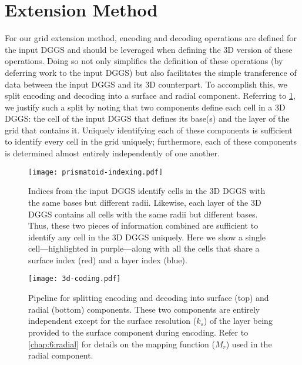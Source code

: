 \section{Extension Method} \label{chap:7:extension}
For our grid extension method, encoding and decoding operations are defined for the input DGGS and should be leveraged when defining the 3D version of these operations.
Doing so not only simplifies the definition of these operations (by deferring work to the input DGGS) but also facilitates the simple transference of data between the input DGGS and its 3D counterpart.
To accomplish this, we split encoding and decoding into a surface and radial component.
Referring to \cref{fig:prismatoid-indexing}, we justify such a split by noting that two components define each cell in a 3D DGGS: the cell of the input DGGS that defines its base(s) and the layer of the grid that contains it.
Uniquely identifying each of these components is sufficient to identify every cell in the grid uniquely; furthermore, each of these components is determined almost entirely independently of one another.


\begin{figure}[htp!]
	\centering
	\texttt{[image: prismatoid-indexing.pdf]}
	\caption[Separation of surface and layer indices for the grid extension method]{
		Indices from the input DGGS identify cells in the 3D DGGS with the same bases but different radii.
		Likewise, each layer of the 3D DGGS contains all cells with the same radii but different bases.
		Thus, these two pieces of information combined are sufficient to identify any cell in the 3D DGGS uniquely.
		Here we show a single cell---highlighted in purple---along with all the cells that share a surface index (red) and a layer index (blue).
	}
	\label{fig:prismatoid-indexing}
\end{figure}


\begin{figure}[htp!]
	\centering
	\texttt{[image: 3d-coding.pdf]}
	\caption[Pipeline for encoding and decoding with the grid extension method]{
		Pipeline for splitting encoding and decoding into surface (top) and radial (bottom) components.
		These two components are entirely independent except for the surface resolution ($k_s$) of the layer being provided to the surface component during encoding.
		Refer to \cref{chap:6:radial} for details on the mapping function ($M_r$) used in the radial component.
	}
	\label{fig:prismatoid-coding}
\end{figure}


